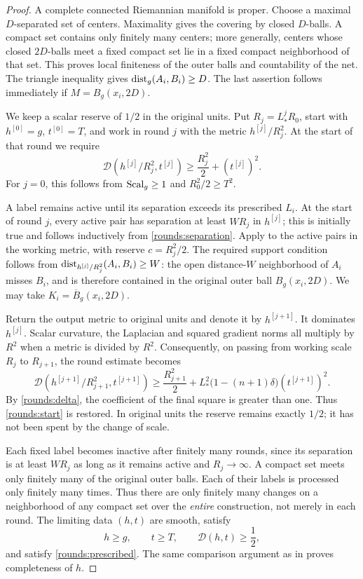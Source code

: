 \begin{proof}
A complete connected Riemannian manifold is proper. Choose a maximal
\(D\)-separated set of centers. Maximality gives the covering by closed
\(D\)-balls. A compact set contains only finitely many centers; more
generally, centers whose closed \(2D\)-balls meet a fixed compact set
lie in a fixed compact neighborhood of that set. This proves local
finiteness of the outer balls and countability of the net. The triangle
inequality gives \(\operatorname{dist}_g(A_i,B_i)\ge D\). The last assertion follows
immediately if \(M=B_g(x_i,2D)\).

We keep a scalar reserve of \(1/2\) in the original units. Put
\(R_j=L_*^jR_0\), start with \(h^{[0]}=g\), \(t^{[0]}=T\), and work in
round \(j\) with the metric \(h^{[j]}/R_j^2\). At the start of that
round we require
\begin{equation}\label{rounds:start}
 \mathcal D(h^{[j]}/R_j^2,t^{[j]})
 \ge \frac{R_j^2}{2}+(t^{[j]})^2.
\end{equation}
For \(j=0\), this follows from \(\operatorname{Scal}_g\ge1\) and
\(R_0^2/2\ge T^2\).

A label remains active until its separation exceeds its prescribed
\(L_i\). At the start of round \(j\), every active pair has separation
at least \(WR_j\) in \(h^{[j]}\); this is initially true and follows
inductively from \eqref{rounds:separation}. Apply  to
the active pairs in the working metric, with reserve \(c=R_j^2/2\).
The required support condition follows from
\(\operatorname{dist}_{h^{[j]}/R_j^2}(A_i,B_i)\ge W\): the open distance-\(W\)
neighborhood of \(A_i\) misses \(B_i\), and is therefore contained in
the original outer ball \(B_g(x_i,2D)\). We may take
\(K_i=\overline B_g(x_i,2D)\).

Return the output metric to original units and denote it by
\(h^{[j+1]}\). It dominates \(h^{[j]}\). Scalar curvature, the
Laplacian and squared gradient norms all multiply by \(R^2\) when a
metric is divided by \(R^2\). Consequently, on passing from working
scale \(R_j\) to \(R_{j+1}\), the round estimate becomes
\[
 \mathcal D(h^{[j+1]}/R_{j+1}^2,t^{[j+1]})
 \ge \frac{R_{j+1}^2}{2}
 +L_*^2\bigl(1-(n+1)\delta\bigr)(t^{[j+1]})^2.
\]
By \eqref{rounds:delta}, the coefficient of the final square is greater
than one. Thus \eqref{rounds:start} is restored. In original units the
reserve remains exactly \(1/2\); it has not been spent by the change
of scale.

Each fixed label becomes inactive after finitely many rounds, since
its separation is at least \(WR_j\) as long as it remains active and
\(R_j\to\infty\). A compact set meets only finitely many of the
original outer balls. Each of their labels is processed only finitely
many times. Thus there are only finitely many changes on a neighborhood
of any compact set over the \emph{entire} construction, not merely in
each round. The limiting data \((h,t)\) are smooth, satisfy
\[
 h\ge g,\qquad t\ge T,\qquad \mathcal D(h,t)\ge\frac12,
\]
and satisfy \eqref{rounds:prescribed}. The same comparison argument as
in  proves completeness of \(h\).


\end{proof}
